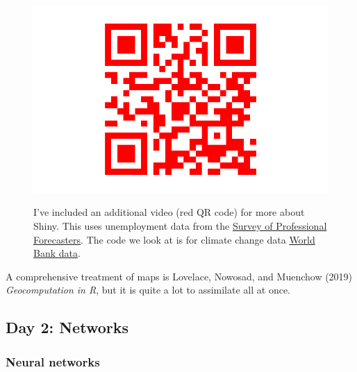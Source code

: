\documentclass[
  letterpaper,
]{book}
\begin{document}
\begin{figure}

\begin{minipage}[t]{0.50\linewidth}

{\centering 

\includegraphics{R2021_files/figure-pdf/unnamed-chunk-2-1.pdf}

}

\end{minipage}%
%
\begin{minipage}[t]{0.50\linewidth}

{\centering 

I've included an additional video (red QR code) for more about Shiny.
This uses unemployment data from the
\href{https://www.philadelphiafed.org/surveys-and-data/real-time-data-research/survey-of-professional-forecasters}{Survey
of Professional Forecasters}. The code we look at is for climate change
data \href{https://climateknowledgeportal.worldbank.org/}{World Bank
data}.

}

\end{minipage}%

\end{figure}

A comprehensive treatment of maps is Lovelace, Nowosad, and Muenchow
(2019) \emph{Geocomputation in R}, but it is quite a lot to assimilate
all at once.

\hypertarget{day-2-networks}{%
\subsection{Day 2: Networks}\label{day-2-networks}}

\hypertarget{neural-networks}{%
\subsubsection{Neural networks}\label{neural-networks}}
\end{document}
